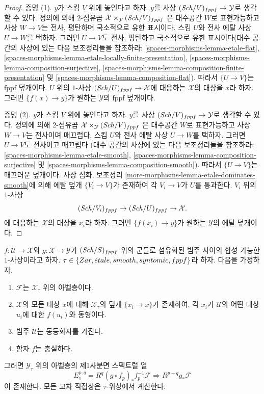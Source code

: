 \begin{proof}
증명 (1). $y$가 스킴 $V$ 위에 놓인다고 하자.
$y$를 사상 $(\mathit{Sch}/V)_{fppf} \to \mathcal{Y}$로 생각할 수 있다.
정의에 의해 $2$-섬유곱
$\mathcal{X} \times_\mathcal{Y} (\mathit{Sch}/V)_{fppf}$
은 대수공간 $W$로 표현가능하고 사상 $W \to V$는 전사,
평탄하며 국소적으로 유한 표시이다. 스킴 $U$와 전사 에탈 사상
$U \to W$를 택하자. 그러면 $U \to V$도 전사, 평탄하고 국소적으로
유한 표시이다(대수 공간의 사상에 있는 다음 보조정리들을 참조하라:
\ref{spaces-morphisms-lemma-etale-flat},
\ref{spaces-morphisms-lemma-etale-locally-finite-presentation},
\ref{spaces-morphisms-lemma-composition-surjective},
\ref{spaces-morphisms-lemma-composition-finite-presentation} 및
\ref{spaces-morphisms-lemma-composition-flat}).
따라서 $\{U \to V\}$는 fppf 덮개이다. $U$ 위의
$1$-사상 $(\mathit{Sch}/U)_{fppf} \to \mathcal{X}$에 대응하는
$\mathcal{X}$의 대상을 $x$라 하자. 그러면
$\{f(x) \to y\}$가 원하는 $\mathcal{Y}$의 fppf 덮개이다.

\medskip\noindent
증명 (2). $y$가 스킴 $V$ 위에 놓인다고 하자.
$y$를 사상 $(\mathit{Sch}/V)_{fppf} \to \mathcal{Y}$로 생각할 수 있다.
정의에 의해 $2$-섬유곱
$\mathcal{X} \times_\mathcal{Y} (\mathit{Sch}/V)_{fppf}$
은 대수공간 $W$로 표현가능하고 사상 $W \to V$는 전사이며
매끄럽다. 스킴 $U$와 전사 에탈 사상 $U \to W$를 택하자.
그러면 $U \to V$도 전사이고 매끄럽다
(대수 공간의 사상에 있는 다음 보조정리들을 참조하라:
\ref{spaces-morphisms-lemma-etale-smooth},
\ref{spaces-morphisms-lemma-composition-surjective} 및
\ref{spaces-morphisms-lemma-composition-smooth}).
따라서 $\{U \to V\}$는 매끄러운 덮개이다.
사상 심화, 보조정리 \ref{more-morphisms-lemma-etale-dominates-smooth}에
의해 에탈 덮개 $\{V_i \to V\}$가 존재하여 각 $V_i \to V$가
$U$를 통과한다. $V_i$ 위의 $1$-사상
$$
(\mathit{Sch}/V_i)_{fppf} \to (\mathit{Sch}/U)_{fppf} \to \mathcal{X}.
$$
에 대응하는 $\mathcal{X}$의 대상을 $x_i$라 하자. 그러면
$\{f(x_i) \to y\}$가 원하는 $\mathcal{Y}$의 에탈 덮개이다.
\end{proof}

\begin{lemma}
\label{lemma-cech-to-cohomology-relative}
$f : \mathcal{U} \to \mathcal{X}$와 $g : \mathcal{X} \to \mathcal{Y}$가
$(\mathit{Sch}/S)_{fppf}$ 위의 군들로 섬유화된 범주 사이의 합성 가능한
$1$-사상이라고 하자. $\tau \in \{Zar, \etale, smooth, syntomic,
\linebreak[0] fppf\}$라 하자. 다음을 가정하자.
\begin{enumerate}
\item $\mathcal{F}$는 $\mathcal{X}_\tau$ 위의 아벨층이다.
\item $\mathcal{X}$의 모든 대상 $x$에 대해
$\mathcal{X}_\tau$의 덮개 $\{x_i \to x\}$가 존재하여,
각 $x_i$가 $\mathcal{U}$의 어떤 대상 $u_i$에 대한
$f(u_i)$와 동형이다.
\item 범주 $\mathcal{U}$는 동등화자를 가진다.
\item 함자 $f$는 충실하다.
\end{enumerate}
그러면 $\mathcal{Y}_\tau$ 위의 아벨층의 제1사분면
스펙트럴 열
$$
E_1^{p, q} = R^q(g \circ f_p)_*f_p^{-1}\mathcal{F}
\Rightarrow
R^{p + q}g_*\mathcal{F}
$$
이 존재한다. 모든 고차 직접상은 $\tau$-위상에서 계산한다.
\end{lemma}

